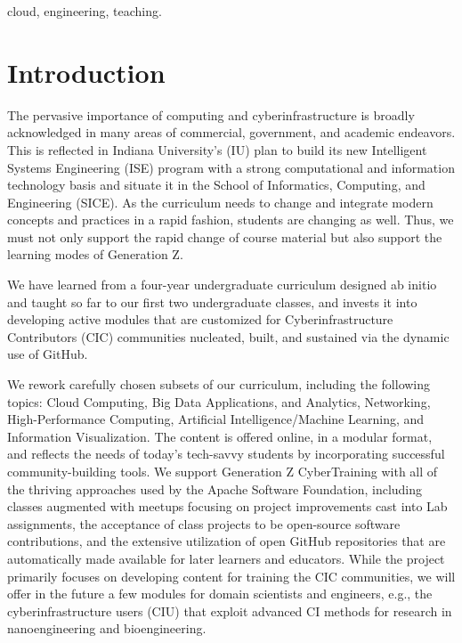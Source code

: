 \documentclass[conference]{IEEEtran}
\begin{document}
\begin{IEEEkeywords}
cloud, engineering, teaching.
\end{IEEEkeywords}

\section{Introduction}


  
The pervasive importance of computing and cyberinfrastructure is broadly acknowledged in many areas of commercial, government, and academic endeavors. This is reflected in Indiana University's (IU) plan to build its new Intelligent Systems Engineering (ISE) program with a strong computational and information technology basis and situate it in the School of Informatics, Computing, and Engineering (SICE). As the curriculum needs to change and integrate modern concepts and practices in a rapid fashion, students are changing as well. Thus, we must not only support the rapid change of course material but also support the learning modes of Generation Z.

We have learned from a four-year undergraduate curriculum designed ab initio and taught so far to our first two undergraduate classes, and invests it into developing active modules that are customized for Cyberinfrastructure Contributors (CIC) communities nucleated, built, and sustained via the dynamic use of GitHub.

We rework carefully chosen subsets of our curriculum, including the following topics: Cloud Computing, Big Data Applications, and Analytics, Networking, High-Performance Computing, Artificial Intelligence/Machine Learning, and Information Visualization. The content is offered online, in a modular format, and reflects the needs of today's tech-savvy students by incorporating successful community-building tools. We support Generation Z CyberTraining with all of the thriving approaches used by the Apache Software Foundation, including classes augmented with meetups focusing on project improvements cast into Lab assignments, the acceptance of class projects to be open-source software contributions, and the extensive utilization of open GitHub repositories that are automatically made available for later learners and educators. While the project primarily focuses on developing content for training the CIC communities, we will offer in the future a few modules for domain scientists and engineers, e.g., the cyberinfrastructure users (CIU) that exploit advanced CI methods for research in nanoengineering and bioengineering.
\end{document}
